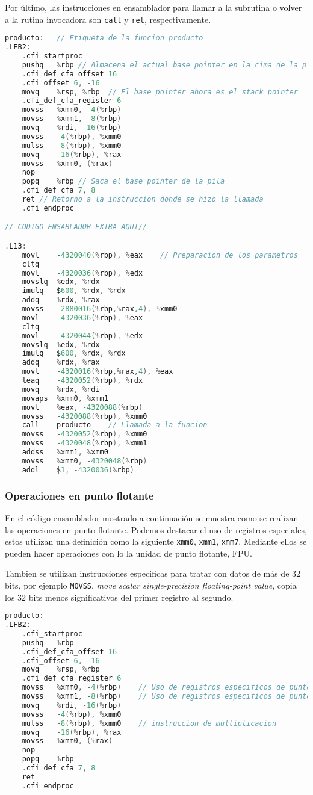 \documentclass[10pt,a4paper]{article}
\begin{document}
Por último, las instrucciones en ensamblador para llamar a la subrutina o volver a la rutina invocadora son \texttt{call} y \texttt{ret}, respectivamente.

\begin{lstlisting}[language=C]
producto:	// Etiqueta de la funcion producto 
.LFB2:
	.cfi_startproc
	pushq	%rbp // Almacena el actual base pointer en la cima de la pila
	.cfi_def_cfa_offset 16
	.cfi_offset 6, -16
	movq	%rsp, %rbp	// El base pointer ahora es el stack pointer
	.cfi_def_cfa_register 6
	movss	%xmm0, -4(%rbp)
	movss	%xmm1, -8(%rbp)
	movq	%rdi, -16(%rbp)
	movss	-4(%rbp), %xmm0
	mulss	-8(%rbp), %xmm0
	movq	-16(%rbp), %rax
	movss	%xmm0, (%rax)
	nop
	popq	%rbp // Saca el base pointer de la pila 
	.cfi_def_cfa 7, 8
	ret // Retorno a la instruccion donde se hizo la llamada 
	.cfi_endproc

// CODIGO ENSABLADOR EXTRA AQUI//

.L13:
	movl	-4320040(%rbp), %eax	// Preparacion de los parametros
	cltq
	movl	-4320036(%rbp), %edx
	movslq	%edx, %rdx
	imulq	$600, %rdx, %rdx
	addq	%rdx, %rax
	movss	-2880016(%rbp,%rax,4), %xmm0
	movl	-4320036(%rbp), %eax
	cltq
	movl	-4320044(%rbp), %edx
	movslq	%edx, %rdx
	imulq	$600, %rdx, %rdx
	addq	%rdx, %rax
	movl	-4320016(%rbp,%rax,4), %eax
	leaq	-4320052(%rbp), %rdx
	movq	%rdx, %rdi
	movaps	%xmm0, %xmm1
	movl	%eax, -4320088(%rbp)
	movss	-4320088(%rbp), %xmm0
	call	producto	// Llamada a la funcion 
	movss	-4320052(%rbp), %xmm0
	movss	-4320048(%rbp), %xmm1
	addss	%xmm1, %xmm0
	movss	%xmm0, -4320048(%rbp)
	addl	$1, -4320036(%rbp)

\end{lstlisting}
\subsubsection{Operaciones en punto flotante}
En el código ensamblador mostrado a continuación se muestra como se realizan las operaciones en punto flotante. Podemos destacar el uso de registros especiales, estos utilizan una definición como la siguiente \texttt{xmm0}, \texttt{xmm1}, \texttt{xmm7}. Mediante ellos se pueden hacer operaciones con lo la unidad de punto flotante, FPU.

Tambien se utilizan instrucciones especificas para tratar con datos de más de 32 bits, por ejemplo \texttt{MOVSS}, \textit{move scalar single-precision floating-point value}, copia los 32 bits menos significativos del primer registro al segundo.  

\begin{lstlisting}[language=C]
producto:
.LFB2:
	.cfi_startproc
	pushq	%rbp 
	.cfi_def_cfa_offset 16
	.cfi_offset 6, -16
	movq	%rsp, %rbp	
	.cfi_def_cfa_register 6
	movss	%xmm0, -4(%rbp)    // Uso de registros especificos de punto flotante
	movss	%xmm1, -8(%rbp)    // Uso de registros especificos de punto flotante
	movq	%rdi, -16(%rbp)
	movss	-4(%rbp), %xmm0    
	mulss	-8(%rbp), %xmm0    // instruccion de multiplicacion 
	movq	-16(%rbp), %rax		
	movss	%xmm0, (%rax)
	nop
	popq	%rbp 
	.cfi_def_cfa 7, 8
	ret 
	.cfi_endproc
\end{lstlisting}
\end{document}

